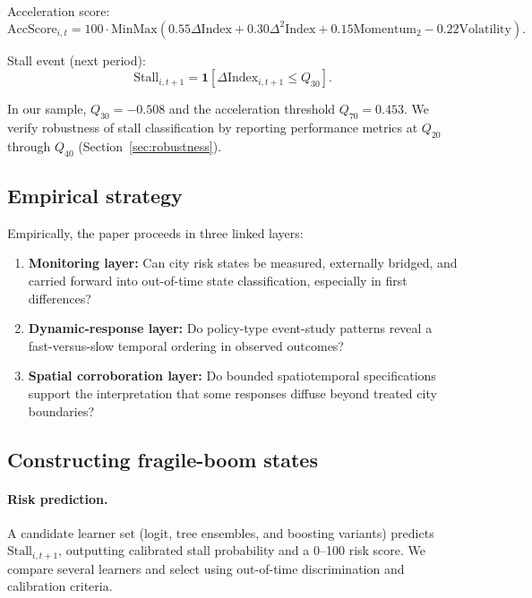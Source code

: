 \documentclass[11pt,a4paper]{article}
\newcommand{\Index}{\text{Index}}
\newcommand{\Volatility}{\text{Volatility}}
\newcommand{\AccScore}{\text{AccScore}}
\newcommand{\Stall}{\text{Stall}}
\begin{document}
Acceleration score:
\begin{equation}
  \AccScore_{i,t} = 100 \cdot \mathrm{MinMax}(0.55 \Delta \Index + 0.30 \Delta^2 \Index + 0.15 \text{Momentum}_2 - 0.22 \Volatility).
\end{equation}

Stall event (next period):
\begin{equation}
  \Stall_{i,t+1} = \mathbf{1}[\Delta \Index_{i,t+1} \le Q_{30}].
\end{equation}

In our sample, $Q_{30} = -0.508$ and the acceleration threshold $Q_{70} = 0.453$.
We verify robustness of stall classification by reporting performance metrics at $Q_{20}$ through $Q_{40}$ (Section~\ref{sec:robustness}).


\subsection{Empirical strategy}
Empirically, the paper proceeds in three linked layers:
\begin{enumerate}[label=\arabic*.]
  \item \textbf{Monitoring layer:} Can city risk states be measured, externally bridged, and carried forward into out-of-time state classification, especially in first differences?
  \item \textbf{Dynamic-response layer:} Do policy-type event-study patterns reveal a fast-versus-slow temporal ordering in observed outcomes?
  \item \textbf{Spatial corroboration layer:} Do bounded spatiotemporal specifications support the interpretation that some responses diffuse beyond treated city boundaries?
\end{enumerate}

\subsection{Constructing fragile-boom states}
\paragraph{Risk prediction.} A candidate learner set (logit, tree ensembles, and boosting variants) predicts $\Stall_{i,t+1}$, outputting calibrated stall probability and a 0--100 risk score.
We compare several learners and select using out-of-time discrimination and calibration criteria.
\end{document}
